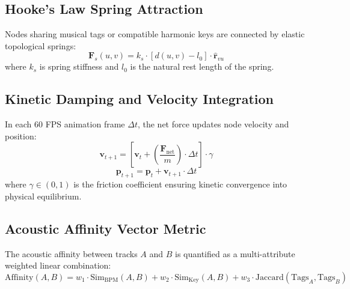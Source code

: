 \documentclass[12pt,a4paper,oneside]{report}
\begin{document}
\subsection{Hooke's Law Spring Attraction}
Nodes sharing musical tags or compatible harmonic keys are connected by elastic topological springs:
\begin{equation}
\mathbf{F}_s(u, v) = k_s \cdot \left[ d(u, v) - l_0 \right] \cdot \hat{\mathbf{r}}_{vu}
\end{equation}
where $k_s$ is spring stiffness and $l_0$ is the natural rest length of the spring.

\subsection{Kinetic Damping and Velocity Integration}
In each 60 FPS animation frame $\Delta t$, the net force updates node velocity and position:
\begin{equation}
\mathbf{v}_{t+1} = \left[ \mathbf{v}_t + \left( \frac{\mathbf{F}_{\text{net}}}{m} \right) \cdot \Delta t \right] \cdot \gamma
\end{equation}
\begin{equation}
\mathbf{p}_{t+1} = \mathbf{p}_t + \mathbf{v}_{t+1} \cdot \Delta t
\end{equation}
where $\gamma \in (0, 1)$ is the friction coefficient ensuring kinetic convergence into physical equilibrium.

\subsection{Acoustic Affinity Vector Metric}
The acoustic affinity between tracks $A$ and $B$ is quantified as a multi-attribute weighted linear combination:
\begin{equation}
\text{Affinity}(A, B) = w_1 \cdot \text{Sim}_{\text{BPM}}(A, B) + w_2 \cdot \text{Sim}_{\text{Key}}(A, B) + w_3 \cdot \text{Jaccard}(\text{Tags}_A, \text{Tags}_B)
\end{equation}
\end{document}
